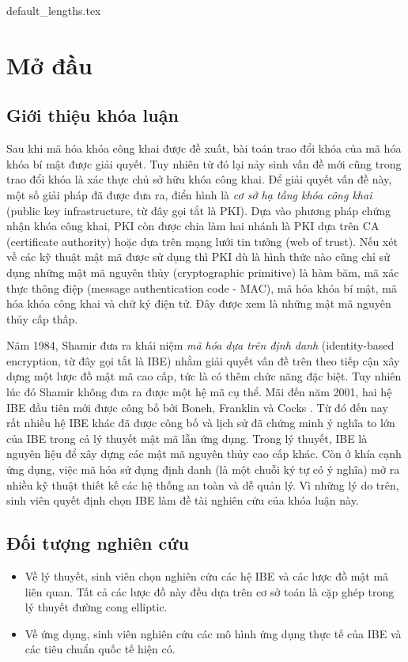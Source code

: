 \documentclass[class=report, crop=false]{standalone}
\begin{document}
	{default_lengths.tex}
	\chapter{Mở đầu}
	\section{Giới thiệu khóa luận}
		Sau khi mã hóa khóa công khai được đề xuất, bài toán trao đổi khóa của mã hóa khóa bí mật được giải quyết. Tuy nhiên từ đó lại nảy sinh vấn đề mới cũng trong trao đổi khóa là xác thực chủ sở hữu khóa công khai. Để giải quyết vấn đề này, một số giải pháp đã được đưa ra, điển hình là \textit{cơ sở hạ tầng khóa công khai} (public key infrastructure, từ đây gọi tắt là PKI). Dựa vào phương pháp chứng nhận khóa công khai, PKI còn được chia làm hai nhánh là PKI dựa trên CA (certificate authority) hoặc dựa trên mạng lưới tin tưởng (web of trust). Nếu xét về các kỹ thuật mật mã được sử dụng thì PKI dù là hình thức nào cũng chỉ sử dụng những mật mã nguyên thủy (cryptographic primitive) là hàm băm, mã xác thực thông điệp (message authentication code - MAC), mã hóa khóa bí mật, mã hóa khóa công khai và chữ ký điện tử. Đây được xem là những mật mã nguyên thủy cấp thấp.

		Năm 1984, Shamir \cite{DBLP:conf/crypto/Shamir84} đưa ra khái niệm \textit{mã hóa dựa trên định danh} (identity-based encryption, từ đây gọi tắt là IBE) nhằm giải quyết vấn đề trên theo tiếp cận xây dựng một lược đồ mật mã cao cấp, tức là có thêm chức năng đặc biệt. Tuy nhiên lúc đó Shamir không đưa ra được một hệ mã cụ thể. Mãi đến năm 2001, hai hệ IBE đầu tiên mới được công bố bởi Boneh, Franklin \cite{DBLP:conf/crypto/BonehF01} và Cocks \cite{DBLP:conf/ima/Cocks01}. Từ đó đến nay rất nhiều hệ IBE khác đã được công bố và lịch sử đã chứng minh ý nghĩa to lớn của IBE trong cả lý thuyết mật mã lẫn ứng dụng. Trong lý thuyết, IBE là nguyên liệu để xây dựng các mật mã nguyên thủy cao cấp khác. Còn ở khía cạnh ứng dụng, việc mã hóa sử dụng định danh (là một chuỗi ký tự có ý nghĩa) mở ra nhiều kỹ thuật thiết kế các hệ thống an toàn và dễ quản lý. Vì những lý do trên, sinh viên quyết định chọn IBE làm đề tài nghiên cứu của khóa luận này.
	\section{Đối tượng nghiên cứu}
		\begin{itemize}
			\item Về lý thuyết, sinh viên chọn nghiên cứu các hệ IBE và các lược đồ mật mã liên quan. Tất cả các lược đồ này đều dựa trên cơ sở toán là cặp ghép trong lý thuyết đường cong elliptic.
			\item Về ứng dụng, sinh viên nghiên cứu các mô hình ứng dụng thực tế của IBE và các tiêu chuẩn quốc tế hiện có.
		\end{itemize}
\end{document}
